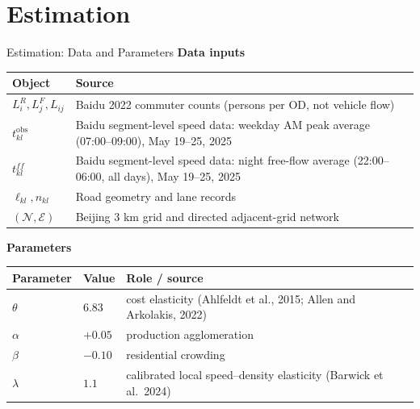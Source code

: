 \documentclass[11pt,aspectratio=169]{beamer}
\newcommand{\navfwd}[1]{\par\vspace{0.35em}\noindent\hfill\hyperlink{#1}{\beamergotobutton{details}}}
\begin{document}
\section{Estimation}\label{sec:quant}
\begin{frame}[label=estparams]{Estimation: Data and Parameters}
\small
\textbf{Data inputs}
\vspace{0.25em}

\scriptsize
\begin{tabularx}{0.92\textwidth}{@{}p{}X@{}}
\toprule
Object & Source \\
\midrule
$L_i^R,L_j^F,L_{ij}$ & Baidu 2022 commuter counts (persons per OD, not vehicle flow) \\
$t_{kl}^{\mathrm{obs}}$ & Baidu segment-level speed data: weekday AM peak average (07:00--09:00), May 19--25, 2025 \\
$t_{kl}^{ff}$ & Baidu segment-level speed data: night free-flow average (22:00--06:00, all days), May 19--25, 2025 \\
$\ell_{kl},n_{kl}$ & Road geometry and lane records \\
$(\mathcal N,\mathcal E)$ & Beijing 3 km grid and directed adjacent-grid network \\
\bottomrule
\end{tabularx}

\vspace{1.0em}
\textbf{Parameters}
\vspace{0.25em}

\scriptsize
\begin{tabularx}{0.92\textwidth}{@{}p{}p{}X@{}}
\toprule
Parameter & Value & Role / source \\
\midrule
$\theta$ & $6.83$ & cost elasticity (Ahlfeldt et al., 2015; Allen and Arkolakis, 2022) \\
$\alpha$ & $+0.05$ & production agglomeration \\
$\beta$ & $-0.10$ & residential crowding \\
$\lambda$ & $1.1$ & calibrated local speed--density elasticity (Barwick et al.\ 2024) \\
\bottomrule
\end{tabularx}
\navfwd{appparams}
\end{frame}
\end{document}
